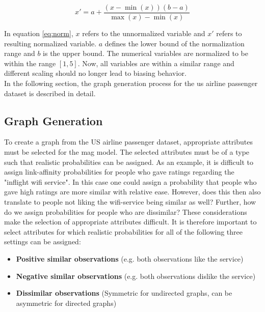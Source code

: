   \begin{equation}
    x' = a + \frac{(x - \min(x))(b - a)}{\max(x) - \min(x)}
    \label{eq:norm}
  \end{equation}

  \noindent In equation \ref{eq:norm}, $x$ refers to the unnormalized 
  variable and $x'$ refers to resulting normalized variable. $a$ defines 
  the lower bound of the normalization range and $b$ is the upper bound. The
  numerical variables are normalized to be within the range $[1,5]$. Now, all 
  variables are within a similar range and different scaling should no longer 
  lead to biasing behavior. \\

  \noindent In the following section, the graph generation process for the
  \acs{us} airline passenger dataset is described in detail.

  \subsection{Graph Generation}
  \label{section:graph_gen}

  To create a graph from the US airline passenger dataset, appropriate
  attributes must be selected for the \acs{mag} model. The selected attributes 
  must be of a type such that realistic probabilities can be assigned. As an 
  example, it is difficult to assign link-affinity probabilities for people who 
  gave ratings regarding the "inflight wifi service". In this case one could 
  assign a probability that people who gave high ratings are more similar with 
  relative ease. However, does this then also translate to people not liking 
  the wifi-service being similar as well? Further, how do we assign 
  probabilities for people who are dissimilar? These considerations make the 
  selection of appropriate attributes difficult. It is therefore important to 
  select attributes for which realistic probabilities for all of the following
  three settings can be assigned:

  \begin{itemize}
    \item \textbf{Positive similar observations} (e.g. both observations like 
      the service)
    \item \textbf{Negative similar observations} (e.g. both observations 
      dislike the service)
    \item \textbf{Dissimilar observations} (Symmetric for undirected graphs, 
      can be asymmetric for directed graphs)
  \end{itemize}
 
